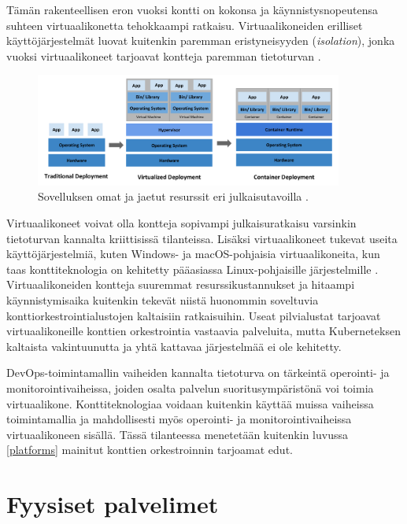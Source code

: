 Tämän rakenteellisen eron vuoksi kontti on kokonsa ja käynnistysnopeutensa suhteen virtuaalikonetta tehokkaampi ratkaisu.
Virtuaalikoneiden erilliset käyttöjärjestelmät luovat kuitenkin paremman eristyneisyyden (\textit{isolation}), jonka vuoksi virtuaalikoneet tarjoavat kontteja paremman tietoturvan \cite{Sultan19}.

\begin{figure}[ht]
\begin{center}
\includegraphics[width=0.9\textwidth]{figures/container_evolution.png}
\caption{Sovelluksen omat ja jaetut resurssit eri julkaisutavoilla \cite{Kubernetes23}\label{fig:container}.}
\end{center}
\end{figure}

Virtuaalikoneet voivat olla kontteja sopivampi julkaisuratkaisu varsinkin tietoturvan kannalta kriittisissä tilanteissa.
Lisäksi virtuaalikoneet tukevat useita käyttöjärjestelmiä, kuten Windows- ja macOS-pohjaisia virtuaalikoneita, kun taas konttiteknologia on kehitetty pääasiassa Linux-pohjaisille järjestelmille \cite{Watada19}.
Virtuaalikoneiden kontteja suuremmat resurssikustannukset ja hitaampi käynnistymisaika kuitenkin tekevät niistä huonommin soveltuvia konttiorkestrointialustojen kaltaisiin ratkaisuihin.
Useat pilvialustat tarjoavat virtuaalikoneille konttien orkestrointia vastaavia palveluita, mutta Kuberneteksen kaltaista vakintuunutta ja yhtä kattavaa järjestelmää ei ole kehitetty. %

DevOps-toimintamallin vaiheiden kannalta tietoturva on tärkeintä operointi- ja monitorointivaiheissa, joiden osalta palvelun suoritusympäristönä voi toimia virtuaalikone.
Konttiteknologiaa voidaan kuitenkin käyttää muissa vaiheissa toimintamallia ja mahdollisesti myös operointi- ja monitorointivaiheissa virtuaalikoneen sisällä.
Tässä tilanteessa menetetään kuitenkin luvussa \ref{platforms} mainitut konttien orkestroinnin tarjoamat edut.

\section{Fyysiset palvelimet}

